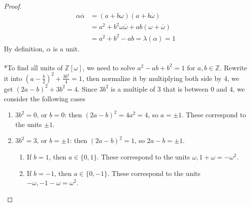 \documentclass{article}
\theoremstyle{definition}
\begin{document}
\begin{proof}
\begin{align*}
\alpha \overline{\alpha} & = (a + b \omega)(a + b \overline{\omega}) \\
& = a^2 + b^2 \omega \overline{\omega} + ab (\omega + \overline{\omega}) \\
& = a^2 + b^2 - ab = \lambda(\alpha) = 1
\end{align*}
By definition, $\alpha$ is a unit.
\\
\\
*To find all units of $\mathbb{Z}[\omega]$, we need to solve $a^2 - ab + b^2 = 1$ for $a, b \in \mathbb{Z}$. Rewrite it into $\left( a - \frac{b}{2} \right)^2 + \frac{3b^2}{4} = 1$, then normalize it by multiplying both side by $4$, we get $(2a - b)^2 + 3b^2 = 4$. Since $3b^2$ is a multiple of $3$ that is between $0$ and $4$, we consider the following cases
\begin{enumerate}
	\item $3b^2 = 0$, or $b = 0$: then $(2a - b)^2 = 4a^2 = 4$, so $a = \pm 1$. These correspond to the units $\pm 1$.
	\item $3b^2 = 3$, or $b = \pm 1$: then $(2a - b)^2 = 1$, so $2a - b = \pm 1$.
	\begin{enumerate}
		\item If $b = 1$, then $a \in \{ 0, 1 \}$. These correspond to the units $\omega, 1 + \omega = -\omega^2$.
		\item If $b = -1$, then $a \in \{ 0, -1 \}$.  These correspond to the units $-\omega, -1-\omega = \omega^2$.
	\end{enumerate}
\end{enumerate}
\end{proof}

\newpage
\end{document}
